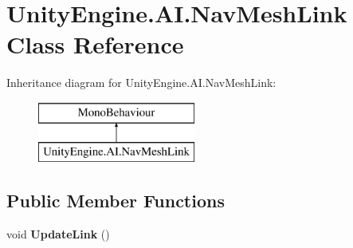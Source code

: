 \hypertarget{class_unity_engine_1_1_a_i_1_1_nav_mesh_link}{}\section{Unity\+Engine.\+A\+I.\+Nav\+Mesh\+Link Class Reference}
\label{class_unity_engine_1_1_a_i_1_1_nav_mesh_link}
Inheritance diagram for Unity\+Engine.\+A\+I.\+Nav\+Mesh\+Link\+:\begin{figure}[H]
\begin{center}
\leavevmode
\includegraphics[height=2.000000cm]{class_unity_engine_1_1_a_i_1_1_nav_mesh_link}
\end{center}
\end{figure}
\subsection*{Public Member Functions}
\begin{DoxyCompactItemize}
\item 
\mbox{\label{class_unity_engine_1_1_a_i_1_1_nav_mesh_link_afb2b43693840e3b4797402528279043a}} 
void {\bfseries Update\+Link} ()
\end{DoxyCompactItemize}
